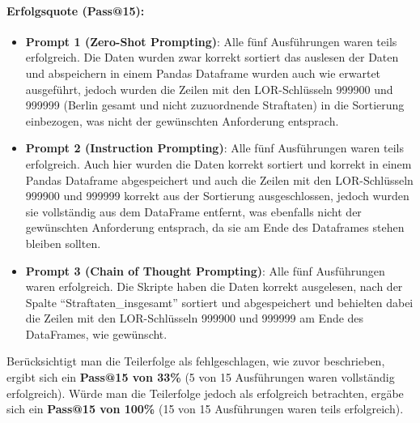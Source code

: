 \documentclass[11pt,a4paper]{article}
\begin{document}
\paragraph{Erfolgsquote (Pass@15):}
\begin{itemize}
    \item \textbf{Prompt 1 (Zero-Shot Prompting)}: Alle fünf Ausführungen waren teils erfolgreich. Die Daten wurden zwar korrekt sortiert das auslesen der Daten und abspeichern in einem Pandas Dataframe wurden auch wie erwartet ausgeführt, jedoch wurden die Zeilen mit den LOR-Schlüsseln 999900 und 999999 (Berlin gesamt und nicht zuzuordnende Straftaten) in die Sortierung einbezogen, was nicht der gewünschten Anforderung entsprach.
    \item \textbf{Prompt 2 (Instruction Prompting)}: Alle fünf Ausführungen waren teils erfolgreich. Auch hier wurden die Daten korrekt sortiert und korrekt in einem Pandas Dataframe abgespeichert und auch die Zeilen mit den LOR-Schlüsseln 999900 und 999999 korrekt aus der Sortierung ausgeschlossen, jedoch wurden sie vollständig aus dem DataFrame entfernt, was ebenfalls nicht der gewünschten Anforderung entsprach, da sie am Ende des Dataframes stehen bleiben sollten.
    \item \textbf{Prompt 3 (Chain of Thought Prompting)}: Alle fünf Ausführungen waren erfolgreich. Die Skripte haben die Daten korrekt ausgelesen, nach der Spalte \enquote{Straftaten\_insgesamt} sortiert und abgespeichert und behielten dabei die Zeilen mit den LOR-Schlüsseln 999900 und 999999 am Ende des DataFrames, wie gewünscht.
\end{itemize}
Berücksichtigt man die Teilerfolge als fehlgeschlagen, wie zuvor beschrieben, ergibt sich ein \textbf{Pass@15 von 33\%} (5 von 15 Ausführungen waren vollständig erfolgreich). Würde man die Teilerfolge jedoch als erfolgreich betrachten, ergäbe sich ein \textbf{Pass@15 von 100\%} (15 von 15 Ausführungen waren teils erfolgreich).
\begin{table}[h]
    \centering
    \caption{Ergebnisse von Testfall 1}
    \label{tab:auswertung_testfall1}
\end{table}
\end{document}
